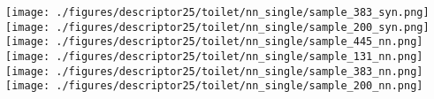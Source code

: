 \documentclass[10pt,twocolumn,letterpaper]{article}
\begin{document}
\begin{figure*}[h]
     \texttt{[image: ./figures/descriptor25/toilet/nn\_single/sample\_383\_syn.png]}          \hspace{-2.5mm}   
     \texttt{[image: ./figures/descriptor25/toilet/nn\_single/sample\_200\_syn.png]}        \hspace{-2.5mm}        
     \texttt{[image: ./figures/descriptor25/toilet/nn\_single/sample\_445\_nn.png]}          \hspace{-3mm}   
     \texttt{[image: ./figures/descriptor25/toilet/nn\_single/sample\_131\_nn.png]}          \hspace{-3mm}   
     \texttt{[image: ./figures/descriptor25/toilet/nn\_single/sample\_383\_nn.png]}          \hspace{-2.5mm}  
     \texttt{[image: ./figures/descriptor25/toilet/nn\_single/sample\_200\_nn.png]}          \\

\end{figure*}
\end{document}
